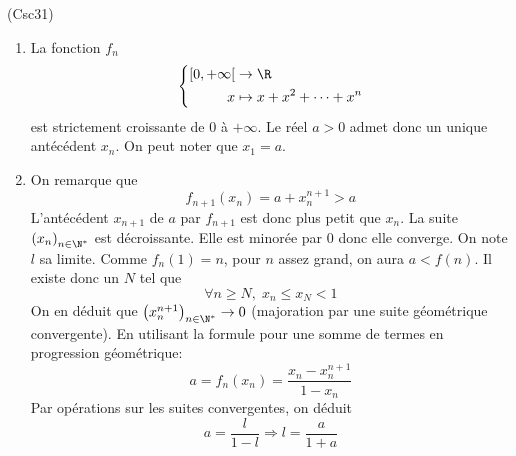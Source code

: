 \begin{tiny}(Csc31)\end{tiny} 
\begin{enumerate}
  \item La fonction $f_n$
\begin{displaymath}
  \left\lbrace 
\begin{aligned}
  \left[ 0 , +\infty \right[ &\rightarrow \R \\
  x &\mapsto x + x^2 + \cdots + x^n
\end{aligned}
\right. 
\end{displaymath}
est strictement croissante de $0$ à $+\infty$. Le réel $a>0$ admet donc un unique antécédent $x_n$. On peut noter que $x_1=a$.
  \item On remarque que
\begin{displaymath}
  f_{n+1}(x_n) = a + x_{n}^{n+1} > a
\end{displaymath}
L'antécédent $x_{n+1}$ de $a$ par $f_{n+1}$ est donc plus petit que $x_n$. La suite $\left( x_n\right)_{n\in \N^*}$ est décroissante. Elle est minorée par $0$ donc elle converge. On note $l$ sa limite.\newline
Comme $f_n(1)=n$, pour $n$ assez grand, on aura $a<f(n)$. Il existe donc un $N$ tel que 
\begin{displaymath}
\forall n\geq N, \; x_n \leq x_N < 1  
\end{displaymath}
On en déduit que $\left( x_n^{n+1}\right)_{n\in \N^*}\rightarrow 0$ (majoration par une suite géométrique convergente). En utilisant la formule pour une somme de termes en progression géométrique:
\begin{displaymath}
  a = f_n(x_n) = \frac{x_n - x_n^{n+1}}{1-x_n}
\end{displaymath}
Par opérations sur les suites convergentes, on déduit
\begin{displaymath}
a = \frac{l}{1-l} \Rightarrow l = \frac{a}{1+a}  
\end{displaymath}

\end{enumerate}
